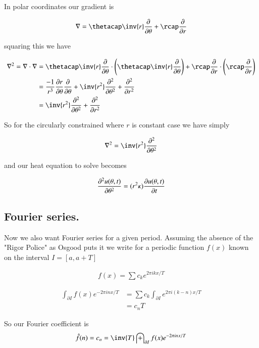 \documentclass{article}
\newcommand{\PDSq}[2]{\frac{\partial^2 {#2}}{\partial {#1}^2}}
\begin{document}
In polar coordinates our gradient is

\begin{align*}
\grad = \thetacap \inv{r} \PD{\theta}{} +\rcap \PD{r}{} 
\end{align*}

squaring this we have

\begin{align*}
\grad^2 = \grad \cdot \grad
&= 
\thetacap \inv{r} \PD{\theta}{} \cdot \left(\thetacap \inv{r} \PD{\theta}{}\right)
 +
\rcap \PD{r}{} \cdot \left(\rcap \PD{r}{} \right) \\
&= 
\frac{-1}{r^3} \PD{\theta}{r} \PD{\theta}{}
+\inv{r^2} \PDSq{\theta}{}
+ \PDSq{r}{}
\\
&= \inv{r^2} \PDSq{\theta}{} + \PDSq{r}{} \\
\end{align*}

So for the circularly constrained where $r$ is constant case we have simply

\begin{align}
\grad^2 = \inv{r^2} \PDSq{\theta}{}
\end{align}

and our heat equation to solve becomes

\begin{align}
\PDSq{\theta}{u(\theta, t)} = (r^2 \kappa) \PD{t}{u(\theta, t)}
\end{align}

\subsection{ Fourier series. }

Now we also want Fourier series for a given period.  Assuming the absence of the "Rigor Police" as Osgood puts it
we write for a periodic function $f(x)$ known on the interval $I = [a, a+T]$

\begin{align*}
f(x) = \sum c_k e^{2\pi i k x/T}
\end{align*}

\begin{align*}
\int_{\partial I} f(x) e^{- 2 \pi i n x /T} 
&= \sum c_k \int_{\partial I} e^{2\pi i (k -n) x/T} \\
&= c_n T
\end{align*}

So our Fourier coefficient is
\begin{align*}
\hat{f}(n) = c_n = \inv{T} \int_{\partial I} f(x) e^{- 2 \pi i n x /T} 
\end{align*}
\end{document}
